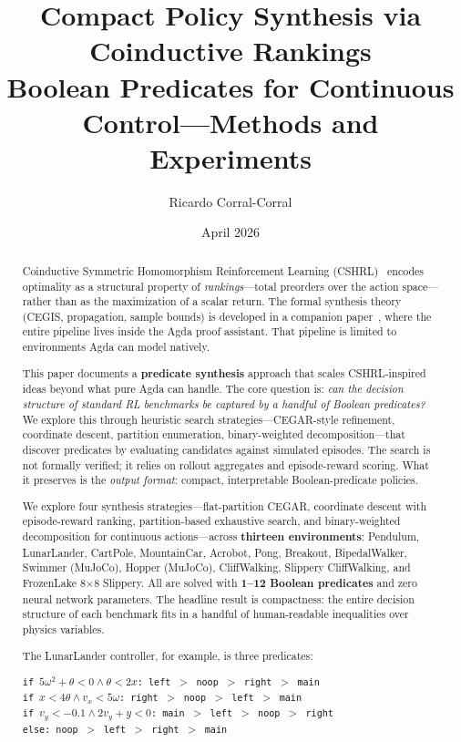 \documentclass[9pt,a4paper]{article}
\title{\textbf{Compact Policy Synthesis via Coinductive Rankings} \\
Boolean Predicates for Continuous Control---Methods and Experiments}
\author{Ricardo Corral-Corral}
\date{April 2026}
\theoremstyle{plain}
\theoremstyle{definition}
\theoremstyle{remark}
\begin{document}
\maketitle

\begin{abstract}
Coinductive Symmetric Homomorphism Reinforcement Learning
(CSHRL)~\cite{CSHRL2026} encodes optimality as a structural
property of \emph{rankings}---total preorders over the action
space---rather than as the maximization of a scalar return.
The formal synthesis theory (CEGIS, propagation, sample
bounds) is developed in a companion paper~\cite{CSHRLSynthesis2026},
where the entire pipeline lives inside the Agda proof assistant.
That pipeline is limited to environments Agda can model natively.

This paper documents a \textbf{predicate synthesis} approach
that scales CSHRL-inspired ideas beyond what pure Agda can
handle.  The core question is: \emph{can the decision structure
of standard RL benchmarks be captured by a handful of Boolean
predicates?}  We explore this through heuristic search
strategies---CEGAR-style refinement, coordinate descent,
partition enumeration, binary-weighted decomposition---that
discover predicates by evaluating candidates against
simulated episodes.  The search is not formally verified;
it relies on rollout aggregates and episode-reward scoring.
What it preserves is the \emph{output format}: compact,
interpretable Boolean-predicate policies.

We explore four synthesis strategies---flat-partition CEGAR,
coordinate descent with episode-reward ranking, partition-based
exhaustive search, and binary-weighted decomposition for
continuous actions---across \textbf{thirteen environments}:
Pendulum, LunarLander, CartPole, MountainCar, Acrobot, Pong,
Breakout, BipedalWalker, Swimmer (MuJoCo), Hopper (MuJoCo),
CliffWalking, Slippery CliffWalking, and FrozenLake 8$\times$8 Slippery.
All are solved with \textbf{1--12 Boolean predicates} and
zero neural network parameters.  The headline result is compactness: the entire
decision structure of each benchmark fits in a handful of
human-readable inequalities over physics variables.

The LunarLander controller, for example, is three predicates:
\begin{center}
\texttt{if $5\omega^2 + \theta < 0 \wedge \theta < 2x$:
left $>$ noop $>$ right $>$ main} \\
\texttt{if $x < 4\theta \wedge v_x < 5\omega$:
right $>$ noop $>$ left $>$ main} \\
\texttt{if $v_y < {-}0.1 \wedge 2v_y + y < 0$:
main $>$ left $>$ noop $>$ right} \\
\texttt{else: noop $>$ left $>$ right $>$ main}
\end{center}
\end{abstract}
\end{document}
